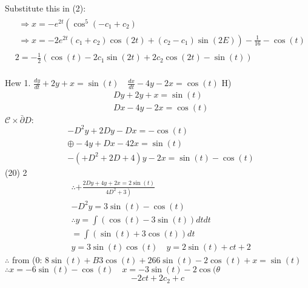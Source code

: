 \documentclass[12pt, a4paper]{article}
\begin{document}
Substitute this in (2):
$$
\begin{aligned}
& \begin{array}{l}
\Rightarrow x=-e^{2 t}\left(\cos ^5\left(-c_1+c_2\right)\right. \\
\left.\Rightarrow x=-2 e^{2 t}\left(c_1+c_2\right) \cos (2 t)+\left(c_2-c_1\right) \sin (2 E)\right)-\frac{1}{16}-\cos (t)
\end{array} \\
& 2=-\frac{1}{2}\left(\cos (t)-2 c_1 \sin (2 t)+2 c_2 \cos (2 t)-\sin (t)\right) \\
&
\end{aligned}
$$

Hew
1. $\frac{d y}{d t}+2 y+x=\sin (t) \quad \frac{d x}{d t}-4 y-2 x=\cos (t)$
H)
$$
\begin{aligned}
& D y+2 y+x=\sin (t) \\
& D x-4 y-2 x=\cos (t)
\end{aligned}
$$
$\mathcal{C} \times \bar{\partial} D:$
$$
\begin{aligned}
& -D^2 y+2 D y-D x=-\cos (t) \\
& \oplus-4 y+D x-42 x=\sin (t) \\
& -\left(+D^2+2 D+4\right) y-2 x=\sin (t)-\cos (t)
\end{aligned}
$$
(20) 2
$$
\begin{aligned}
& \therefore+\frac{2 D y+4 y+2 x=2 \sin (t)}{\left.4 D^2+3\right)} \\
&-D^2 y=3 \sin (t)-\cos (t) \\
& \therefore y=\int(\cos (t)-3 \sin (t)) d t d t \\
&=\int(\sin (t)+3 \cos (t)) d t \\
& y=3 \sin (t) \cos (t) \quad y=2 \sin (t)+c t+2
\end{aligned}
$$
$\therefore$ from (0:
$8 \sin (t)+B 3 \cos (t)+266 \sin (t)-2 \cos (t)+x=\sin (t)$
$\therefore x=-6 \sin (t)-\cos (t) \quad x=-3 \sin (t)-2 \cos (\theta$
$$
-2 c t+2 c_2+c
$$
\end{document}
